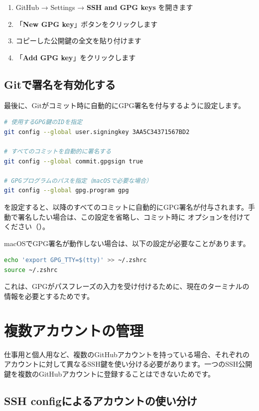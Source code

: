 \begin{enumerate}
  \item GitHub → Settings → \textbf{SSH and GPG keys} を開きます
  \item 「\textbf{New GPG key}」ボタンをクリックします
  \item コピーした公開鍵の全文を貼り付けます
  \item 「\textbf{Add GPG key}」をクリックします
\end{enumerate}

\subsection{Gitで署名を有効化する}

最後に、Gitがコミット時に自動的にGPG署名を付与するように設定します。

\begin{lstlisting}[language=bash]
# 使用するGPG鍵のIDを指定
git config --global user.signingkey 3AA5C34371567BD2

# すべてのコミットを自動的に署名する
git config --global commit.gpgsign true

# GPGプログラムのパスを指定（macOSで必要な場合）
git config --global gpg.program gpg
\end{lstlisting}

 を設定すると、以降のすべてのコミットに自動的にGPG署名が付与されます。手動で署名したい場合は、この設定を省略し、コミット時に  オプションを付けてください（）。

macOSでGPG署名が動作しない場合は、以下の設定が必要なことがあります。

\begin{lstlisting}[language=bash]
echo 'export GPG_TTY=$(tty)' >> ~/.zshrc
source ~/.zshrc
\end{lstlisting}

これは、GPGがパスフレーズの入力を受け付けるために、現在のターミナルの情報を必要とするためです。

\section{複数アカウントの管理}

仕事用と個人用など、複数のGitHubアカウントを持っている場合、それぞれのアカウントに対して異なるSSH鍵を使い分ける必要があります。一つのSSH公開鍵を複数のGitHubアカウントに登録することはできないためです。

\subsection{SSH configによるアカウントの使い分け}

